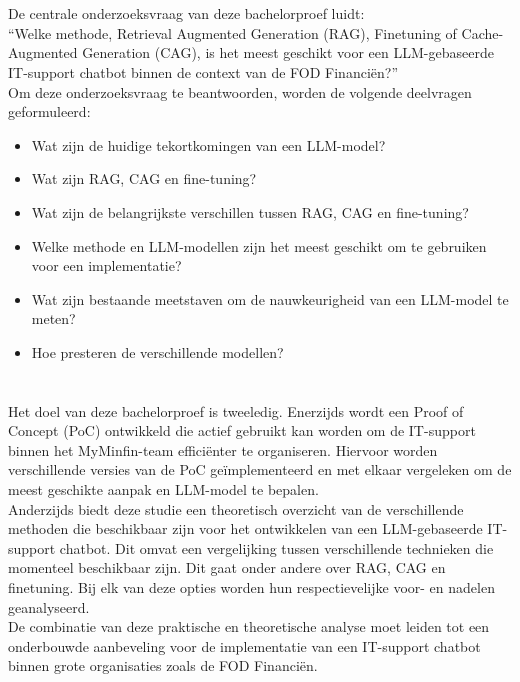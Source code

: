 \section{}%
\label{sec:onderzoeksvraag}

De centrale onderzoeksvraag van deze bachelorproef luidt:
\\[1em]
“{Welke methode, Retrieval Augmented Generation (RAG), Finetuning of Cache-Augmented Generation (CAG), is het meest geschikt voor een LLM-gebaseerde IT-support chatbot binnen de context van de FOD Financiën?}”
\\[1em]
Om deze onderzoeksvraag te beantwoorden, worden de volgende deelvragen geformuleerd:

\begin{itemize}
    \item Wat zijn de huidige tekortkomingen van een LLM-model?
    \item Wat zijn  RAG, CAG en fine-tuning?
    \item Wat zijn de belangrijkste verschillen tussen RAG, CAG en fine-tuning?
    \item Welke methode en LLM-modellen zijn het meest geschikt om te gebruiken voor een implementatie?
    \item Wat zijn bestaande meetstaven om de nauwkeurigheid van een LLM-model te meten?
    \item Hoe presteren de verschillende modellen?
\end{itemize}

\section{}%
\label{sec:onderzoeksdoelstelling}

Het doel van deze bachelorproef is tweeledig. Enerzijds wordt een Proof of Concept (PoC) ontwikkeld die actief gebruikt kan worden om de IT-support binnen het MyMinfin-team efficiënter te organiseren. Hiervoor worden verschillende versies van de PoC geïmplementeerd en met elkaar vergeleken om de meest geschikte aanpak en LLM-model te bepalen.
\\[1em]
Anderzijds biedt deze studie een theoretisch overzicht van de verschillende methoden die beschikbaar zijn voor het ontwikkelen van een LLM-gebaseerde IT-support chatbot. Dit omvat een vergelijking tussen verschillende technieken die momenteel beschikbaar zijn. Dit gaat onder andere over RAG, CAG en finetuning. Bij elk van deze opties worden hun respectievelijke voor- en nadelen geanalyseerd.
\\[1em]
De combinatie van deze praktische en theoretische analyse moet leiden tot een onderbouwde aanbeveling voor de implementatie van een IT-support chatbot binnen grote organisaties zoals de FOD Financiën.

